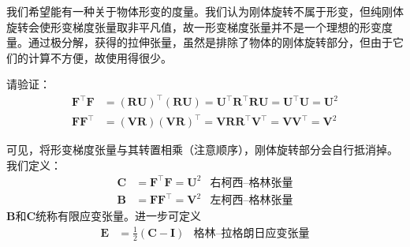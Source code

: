 \documentclass[main.tex]{subfiles}
\begin{document}
我们希望能有一种关于物体形变的度量。我们认为刚体旋转不属于形变，但纯刚体旋转会使形变梯度张量取非平凡值，故一形变梯度张量并不是一个理想的形变度量。通过极分解，获得的拉伸张量，虽然是排除了物体的刚体旋转部分，但由于它们的计算不方便，故使用得很少。

\begin{example}
请验证：
\begin{align*}
\mathbf{F}^\intercal\mathbf{F}&=\left(\mathbf{RU}\right)^\intercal\left(\mathbf{RU}\right)=\mathbf{U}^\intercal\mathbf{R}^\intercal\mathbf{RU}=\mathbf{U}^\intercal\mathbf{U}=\mathbf{U}^2\\
\mathbf{FF}^\intercal&=\left(\mathbf{VR}\right)\left(\mathbf{VR}\right)^\intercal=\mathbf{VRR}^\intercal\mathbf{V}^\intercal=\mathbf{VV}^\intercal=\mathbf{V}^2
\end{align*}
\end{example}

可见，将形变梯度张量与其转置相乘（注意顺序），刚体旋转部分会自行抵消掉。我们定义：
\begin{align*}
    \mathbf{C}&=\mathbf{F}^\intercal\mathbf{F}=\mathbf{U}^2&\text{右柯西--格林张量}\\
    \mathbf{B}&=\mathbf{FF}^\intercal=\mathbf{V}^2&\text{左柯西--格林张量}
\end{align*}
$\mathbf{B}$和$\mathbf{C}$统称有限应变张量。进一步可定义
\begin{align*}
    \mathbf{E}&=\frac{1}{2}\left(\mathbf{C}-\mathbf{I}\right)&\text{格林--拉格朗日应变张量}
\end{align*}
\end{document}
